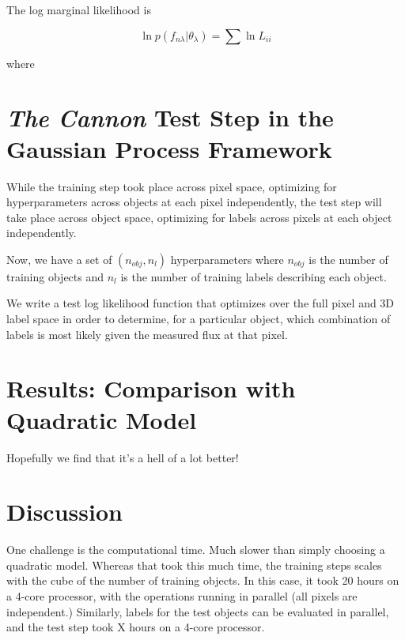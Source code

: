 \documentclass[12pt, preprint]{aastex}
\begin{document}
The log marginal likelihood is

\begin{equation}
  \ln{p}(f_{n \lambda} | \theta_\lambda) = \sum \ln{L_{ii}}
\end{equation}

where

\beq



\section{\emph{The Cannon} Test Step in the Gaussian Process Framework}

While the training step took place across pixel space, optimizing for 
hyperparameters across objects at each pixel independently, the test step 
will take place across object space, optimizing for labels across pixels at 
each object independently.

Now, we have a set of $(n_{obj}, n_{l})$ hyperparameters where $n_{obj}$ is 
the number of training objects and $n_{l}$ is the number of training labels 
describing each object.

We write a test log likelihood function that optimizes over the full pixel 
and 3D label space in order to determine, for a particular object, which 
combination of labels is most likely given the measured flux at that pixel.








\section{Results: Comparison with Quadratic Model}

Hopefully we find that it's a hell of a lot better!

\section{Discussion}

One challenge is the computational time. Much slower than simply choosing 
a quadratic model. Whereas that took this much time, the training steps scales 
with the cube of the number of training objects. In this case, it took 20 
hours on a 4-core processor, with the operations running in parallel (all 
pixels are independent.) Similarly, labels for the test objects can be 
evaluated in parallel, and the test step took X hours on a 4-core processor. 
\end{document}
